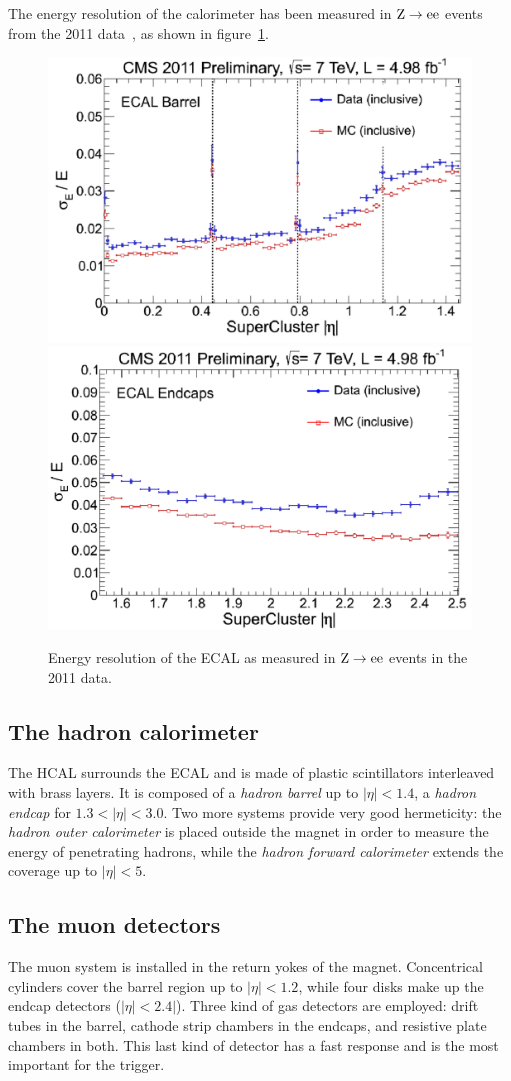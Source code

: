 The energy resolution of the calorimeter has been measured in $\mathrm{Z}
\rightarrow \mathrm{e}\mathrm{e}$ events from the 2011 data~\cite{CMS-DP-2012-007}, as shown in
figure~\ref{fig:ecal_resolution}.

\begin{figure}[htb]
    \centering
    \includegraphics[width=.48\textwidth]{images/pdf/ecal_barrel_resolution}
    \includegraphics[width=.48\textwidth]{images/pdf/ecal_endcap_resolution}
    \caption{Energy resolution of the ECAL as measured in $\mathrm{Z} \rightarrow
    \mathrm{e}\mathrm{e}$ events in the 2011 data.}
    \label{fig:ecal_resolution}
\end{figure}

\subsection{The hadron calorimeter}
The HCAL surrounds the ECAL and is made of plastic scintillators interleaved with brass layers.
It is composed of a \emph{hadron barrel} up to $|\eta| < 1.4$, a
\emph{hadron endcap} for $1.3 < |\eta| < 3.0$. Two more systems provide
very good hermeticity: the \emph{hadron outer calorimeter} is placed
outside  the magnet in order to measure the energy of penetrating hadrons,
while the \emph{hadron forward calorimeter} extends the coverage up to
$|\eta| < 5$.

\subsection{The muon detectors}
The muon system is installed in the return yokes of the magnet. Concentrical
cylinders cover the barrel region up to $|\eta| < 1.2$, while four disks
make up the endcap detectors ($|\eta| < 2.4|$). Three kind of gas detectors
are employed: drift tubes in the barrel, cathode strip chambers in the
endcaps, and resistive plate chambers in both. This last kind of detector
has a fast response and is the most important for the trigger.

